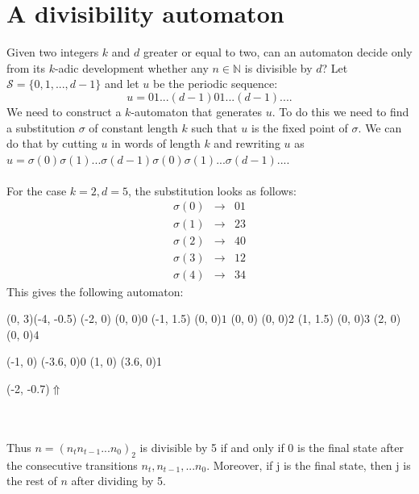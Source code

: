 \documentclass{article}
\begin{document}
\section*{A divisibility automaton}
Given two integers $k$ and $d$ greater or equal to two, can an automaton 
decide only from its $k$-adic development whether any $n \in \mathbb{N}$ is
divisible by $d$? Let $\mathcal{S} = \{0, 1, ..., d - 1\}$ and let $u$ be the
periodic sequence:
\begin{displaymath}
  u = 01...(d - 1)01...(d - 1)... .
\end{displaymath}
We need to construct a $k$-automaton that generates $u$. To do this we need to
find a substitution $\sigma$ of constant length $k$ such that $u$ is the fixed
point of $\sigma$. We can do that by cutting $u$ in words of length $k$ and
rewriting $u$ as
$u = \sigma(0)\sigma(1)...\sigma(d - 1)\sigma(0)\sigma(1)...\sigma(d - 1)...$.\\
\\
For the case $k = 2, d = 5$, the substitution looks as follows:\\
\vbox{\begin{eqnarray*}
  \sigma(0) &\rightarrow& 01\\
  \sigma(1) &\rightarrow& 23\\
  \sigma(2) &\rightarrow& 40\\
  \sigma(3) &\rightarrow& 12\\
  \sigma(4) &\rightarrow& 34
\end{eqnarray*}}
This gives the following automaton:\\
\begin{graph}(0, 3)(-4, -0.5)
  (-2, 0) (0, 0){$0$}
  (-1, 1.5) (0, 0){$1$}
  (0, 0) (0, 0){$2$}
  (1, 1.5) (0, 0){$3$}
  (2, 0) (0, 0){$4$}

  (-1, 0) \freetext(-3.6, 0){0}
   
   
   
   
   
   
   
   
  (1, 0) \freetext(3.6, 0){1}

  \freetext(-2, -0.7){$\Uparrow$}
\end{graph}\\
\\
Thus $n = (n_t n_{t - 1} ... n_0)_2$ is divisible by 5 if and only if 0 is
the final state after the consecutive transitions $n_t, n_{t - 1}, ... n_0$.
Moreover, if j is the final state, then j is the rest of $n$ after dividing
by 5.
\end{document}
